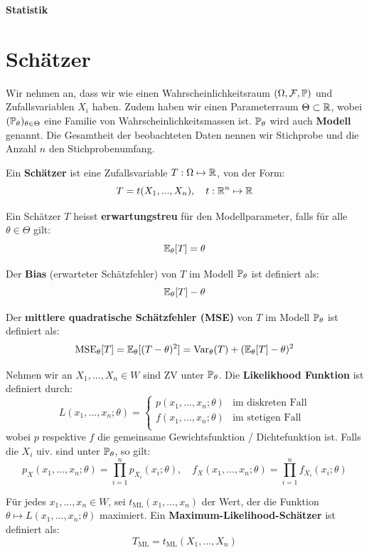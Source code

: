 \begin{center}
	\Huge{\textbf{Statistik}}
\end{center}

\section{Schätzer}

Wir nehmen an, dass wir wie einen Wahrscheinlichkeitsraum $(\Omega, \mathcal{F}, \mathbb{P})$ und Zufallsvariablen $X_i$ haben. Zudem haben wir einen Parameterraum $\Theta \subset \mathbb{R}$, wobei $(\mathbb{P}_\theta)_{\theta \in \Theta}$ eine Familie von Wahrscheinlichkeitsmassen ist. $\mathbb{P}_\theta$ wird auch \textbf{Modell} genannt. Die Gesamtheit der beobachteten Daten nennen wir Stichprobe und die Anzahl $n$ den Stichprobenumfang.

\begin{tcolorbox}
    Ein \textbf{Schätzer} ist eine Zufallsvariable $T: \Omega \mapsto \mathbb{R}$, von der Form:
    $$T = t(X_1,...,X_n), \quad t:\mathbb{R}^n \mapsto \mathbb{R}$$
\end{tcolorbox}

Ein Schätzer $T$ heisst \textbf{erwartungstreu} für den Modellparameter, falls für alle $\theta \in \Theta$ gilt:
$$\mathbb{E}_\theta[T] = \theta$$

Der \textbf{Bias} (erwarteter Schätzfehler) von $T$ im Modell $\mathbb{P}_\theta$ ist definiert als:
$$\mathbb{E}_\theta[T] - \theta$$

Der \textbf{mittlere quadratische Schätzfehler (MSE)} von $T$ im Modell $\mathbb{P}_\theta$ ist definiert als:
$$\text{MSE}_\theta[T] = \mathbb{E}_\theta[(T-\theta)^2] = \text{Var}_\theta(T) + (\mathbb{E}_\theta[T] - \theta)^2$$



Nehmen wir an $X_1,...,X_n \in W$ sind ZV unter $\mathbb{P}_\theta$. Die \textbf{Likelikhood Funktion} ist definiert durch:
$$L(x_1, ..., x_n; \theta) = \begin{cases}
p(x_1, ..., x_n; \theta) & \text{im diskreten Fall} \\
f(x_1, ..., x_n; \theta) & \text{im stetigen Fall} \\
\end{cases}$$
wobei $p$ respektive $f$ die gemeinsame Gewichtsfunktion / Dichtefunktion ist. Falls die $X_i$ uiv. sind unter $\mathbb{P}_\theta$, so gilt:
$$p_X(x_1,...,x_n;\theta) = \prod_{i=1}^n p_{X_i}(x_i; \theta), \quad f_X(x_1,...,x_n;\theta) = \prod_{i=1}^n f_{X_i}(x_i; \theta)$$

Für jedes $x_1, ..., x_n \in W$, sei $t_{\text{ML}}(x_1, ..., x_n)$ der Wert, der die Funktion $\theta \mapsto L(x_1, ..., x_n; \theta)$ maximiert. Ein \textbf{Maximum-Likelihood-Schätzer} ist definiert als: 
$$T_{\text{ML}} = t_{\text{ML}}(X_1,...,X_n)$$

